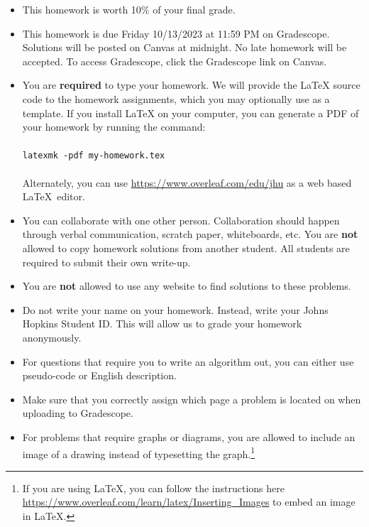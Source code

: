 \documentclass[letter,11pt]{article}
\begin{document}
\begin{itemize}
\item This homework is worth 10\% of your final grade.

\item This homework is due Friday 10/13/2023 at 11:59 PM on
  Gradescope.  Solutions will be posted on Canvas at midnight.  No late homework will be accepted.  To access Gradescope, click the Gradescope link on Canvas.

\item You are \textbf{required} to type your homework.  We will
  provide the \LaTeX{} source code to the homework assignments, which you may
  optionally use as a template.  If you install \LaTeX{} on your computer, you can
  generate a PDF of
  your homework by running the command: \\
  \\
  \texttt{latexmk~-pdf~my-homework.tex} \\
  \\
  Alternately, you can use \url{https://www.overleaf.com/edu/jhu} as a web based
  \LaTeX~editor.

\item You can collaborate with one other person.
    Collaboration should happen through verbal communication, scratch paper,
    whiteboards, etc.  You are \textbf{not} allowed to copy homework
    solutions from another student.  All students are required to submit their
    own write-up.

\item You are \textbf{not} allowed to use any website to find solutions to these problems.

\item Do not write your name on your homework. Instead, write your Johns Hopkins Student ID.  This will allow us to grade your homework anonymously.

\item For questions that require you to write an algorithm out, you can either use pseudo-code or English description.

\item Make sure that you correctly assign which page a problem is located on when uploading to Gradescope.

\item For problems that require graphs or diagrams, you are allowed to include an image of a drawing instead of typesetting the graph.\footnote{If you are using LaTeX, you can follow the instructions here \url{https://www.overleaf.com/learn/latex/Inserting_Images} to embed an image in LaTeX.}
\end{itemize}
\end{document}
